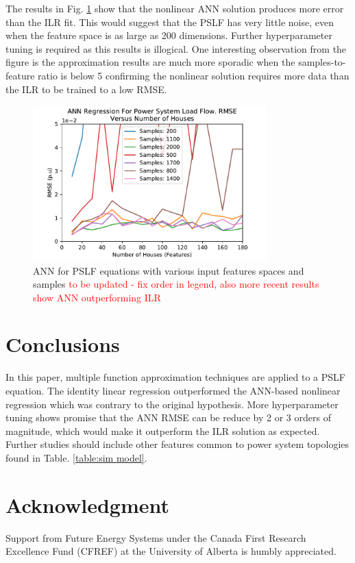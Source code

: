 \documentclass[conference]{IEEEtran}
\begin{document}
The results in Fig. \ref{fig:annresults} show that the nonlinear ANN solution produces more error than the ILR fit. This would suggest that the PSLF has very little noise, even when the feature space is as large as 200 dimensions. Further hyperparameter tuning is required as this results is illogical. One interesting observation from the figure is the approximation results are much more sporadic when the samples-to-feature ratio is below 5 confirming the nonlinear solution requires more data than the ILR to be trained to a low RMSE.

\begin{figure}[h]
	\centering
	\includegraphics[width=9cm]{annrmsevsfeatures_familyofcurves.pdf}
	\caption{ANN for PSLF equations with various input features spaces and samples \textcolor{red}{to be updated - fix order in legend, also more recent results show ANN outperforming ILR}}
	\label{fig:annresults}
\end{figure}

\section{Conclusions}
\label{sec:conc}
In this paper, multiple function approximation techniques are applied to a PSLF equation. The identity linear regression outperformed the ANN-based nonlinear regression which was contrary to the original hypothesis. More hyperparameter tuning shows promise that the ANN RMSE can be reduce by 2 or 3 orders of magnitude, which would make it outperform the ILR solution as expected. Further studies should include other features common to power system topologies found in Table. \ref{table:sim model}.

\section*{Acknowledgment}
Support from Future Energy Systems under the Canada First Research Excellence Fund (CFREF) at the University of Alberta is humbly appreciated.




\end{document}
